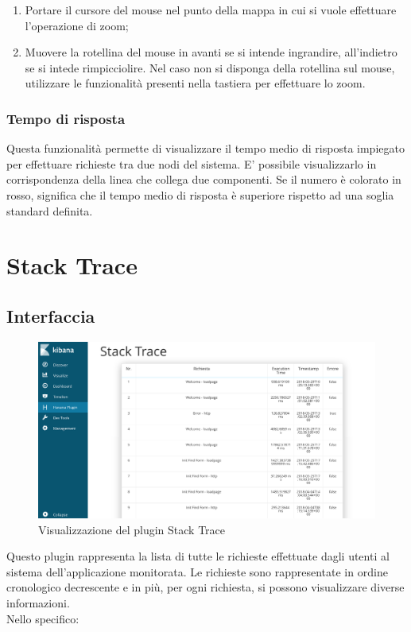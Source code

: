 \begin{enumerate}
	
	\item Portare il cursore del mouse nel punto della mappa in cui si vuole effettuare l'operazione di zoom;
	\item Muovere la rotellina del mouse in avanti se si intende ingrandire, all'indietro se si intede rimpicciolire. Nel caso non si disponga della rotellina sul mouse, utilizzare le funzionalità presenti nella tastiera per effettuare lo zoom.
	
\end{enumerate}

\subsubsection{Tempo di risposta}
Questa funzionalità permette di visualizzare il tempo medio di risposta impiegato per effettuare richieste tra due nodi del sistema.
E' possibile visualizzarlo in corrispondenza della linea che collega due componenti.
Se il numero è colorato in rosso, significa che il tempo medio di risposta è superiore rispetto ad una soglia standard definita.




\section{Stack Trace}
\label{sec:strace}
\subsection{Interfaccia}
\begin{figure}[H]
	\centering 
	\includegraphics[width=1\textwidth]{Images/stack}
	\caption{Visualizzazione del plugin Stack Trace}
\end{figure}
Questo plugin rappresenta la lista di tutte le richieste effettuate dagli utenti al sistema dell'applicazione monitorata. Le richieste sono rappresentate in ordine cronologico decrescente e in più, per ogni richiesta, si possono visualizzare diverse informazioni.\\ Nello specifico:
   
